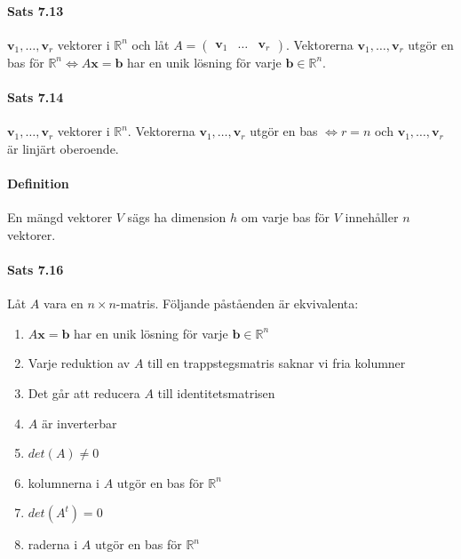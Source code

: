 \paragraph{Sats 7.13} $\bm{v}_{1},\ldots,\bm{v}_{r}$ vektorer i $\mathbb{R}^{n}$ 
och låt $A=\begin{pmatrix}\bm{v}_{1}&\ldots&\bm{v}_{r}\end{pmatrix}$.
Vektorerna $\bm{v}_{1},\ldots,\bm{v}_{r}$ utgör en bas för $\mathbb{R}^{n} \Leftrightarrow A\bm{x}=\bm{b}$ 
har en unik lösning för varje $\bm{b}\in\mathbb{R}^{n}$.

\paragraph{Sats 7.14} $\bm{v}_{1},\ldots,\bm{v}_{r}$ vektorer i $\mathbb{R}^{n}$.
Vektorerna $\bm{v}_{1},\ldots,\bm{v}_{r}$ utgör en bas $\Leftrightarrow r=n$ och $\bm{v}_{1},\ldots,\bm{v}_{r}$ är linjärt oberoende.

\paragraph{Definition} En mängd vektorer $V$ sägs ha dimension $h$ om varje bas för $V$ innehåller $n$ vektorer.

\paragraph{Sats 7.16} Låt $A$ vara en $n\times n$-matris.
Följande påståenden är ekvivalenta:
\begin{enumerate}
    \item $A\bm{x}=\bm{b}$ har en unik lösning för varje $\bm{b}\in\mathbb{R}^{n}$
    \item Varje reduktion av $A$ till en trappstegsmatris saknar vi fria kolumner
    \item Det går att reducera $A$ till identitetsmatrisen
    \item $A$ är inverterbar
    \item $det(A)\neq 0$
    \item kolumnerna i $A$ utgör en bas för $\mathbb{R}^{n}$
    \item $det(A^{t})=0$
    \item raderna i $A$ utgör en bas för $\mathbb{R}^{n}$
\end{enumerate}

